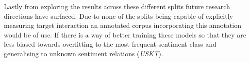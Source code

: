 Lastly from exploring the results across these different splits future research directions have surfaced. Due to none of the splits being capable of explicitly measuring target interaction an annotated corpus incorporating this annotation would be of use. If there is a way of better training these models so that they are less biased towards overfitting to the most frequent sentiment class and generalising to unknown sentiment relations (\textit{USKT}).


